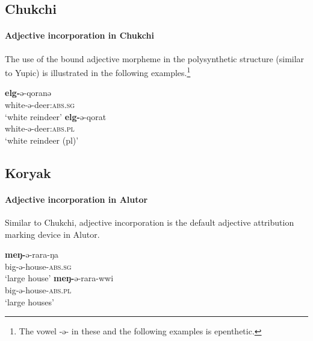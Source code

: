 \subsection{Chukchi}
\paragraph{Adjective incorporation in Chukchi}
The use of the bound adjective morpheme in the polysynthetic structure (similar to Yupic) is illustrated in the following examples.\footnote{The vowel -ə- in these and the following examples is epenthetic.}
\begin{exe}
\ex {}
\begin{xlist}
\ex	
\gll	\textbf{elg-}ə-qoranə\\
	white-ə-deer:\textsc{abs.sg}\\
\glt	‘white reindeer’
\ex
\gll	\textbf{elg-}ə-qorat\\
	white-ə-deer:\textsc{abs.pl}\\
\glt	‘white reindeer (pl)’
\end{xlist}
\end{exe}

\subsection{Koryak}
\paragraph{Adjective incorporation in Alutor}
Similar to Chukchi, adjective incorporation is the default adjective attribution marking device in Alutor.
\begin{exe}
\ex {}
\begin{xlist}
\ex
\gll	\textbf{meŋ-}ə-rara-ŋa\\
	big-ə-house-\textsc{abs.sg}\\
\glt	‘large house’
\ex
\gll	\textbf{meŋ-}ə-rara-wwi\\
	big-ə-house-\textsc{abs.pl}\\
\glt	‘large houses’
\end{xlist}
\end{exe}


